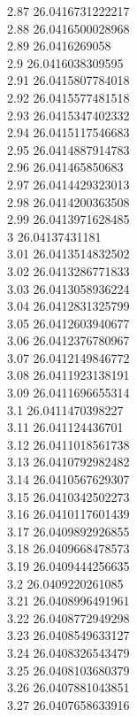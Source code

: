 {2.87	26.0416731222217\\
2.88	26.0416500028968\\
2.89	26.0416269058\\
2.9	26.0416038309595\\
2.91	26.0415807784018\\
2.92	26.0415577481518\\
2.93	26.0415347402332\\
2.94	26.0415117546683\\
2.95	26.0414887914783\\
2.96	26.041465850683\\
2.97	26.0414429323013\\
2.98	26.0414200363508\\
2.99	26.0413971628485\\
3	26.04137431181\\
3.01	26.0413514832502\\
3.02	26.0413286771833\\
3.03	26.0413058936224\\
3.04	26.0412831325799\\
3.05	26.0412603940677\\
3.06	26.0412376780967\\
3.07	26.0412149846772\\
3.08	26.0411923138191\\
3.09	26.0411696655314\\
3.1	26.0411470398227\\
3.11	26.041124436701\\
3.12	26.0411018561738\\
3.13	26.0410792982482\\
3.14	26.0410567629307\\
3.15	26.0410342502273\\
3.16	26.0410117601439\\
3.17	26.0409892926855\\
3.18	26.0409668478573\\
3.19	26.0409444256635\\
3.2	26.0409220261085\\
3.21	26.0408996491961\\
3.22	26.0408772949298\\
3.23	26.0408549633127\\
3.24	26.0408326543479\\
3.25	26.0408103680379\\
3.26	26.0407881043851\\
3.27	26.0407658633916\\
}
